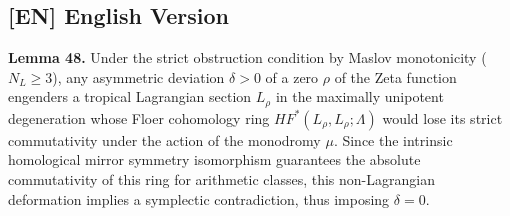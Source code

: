 \documentclass{article}
\begin{document}
\subsection*{[EN] English Version}
\textbf{Lemma 48.} Under the strict obstruction condition by Maslov monotonicity ($N_L \ge 3$), any asymmetric deviation $\delta > 0$ of a zero $\rho$ of the Zeta function engenders a tropical Lagrangian section $L_\rho$ in the maximally unipotent degeneration whose Floer cohomology ring $HF^*(L_\rho, L_\rho; \Lambda)$ would lose its strict commutativity under the action of the monodromy $\mu$. Since the intrinsic homological mirror symmetry isomorphism guarantees the absolute commutativity of this ring for arithmetic classes, this non-Lagrangian deformation implies a symplectic contradiction, thus imposing $\delta = 0$.
\end{document}
